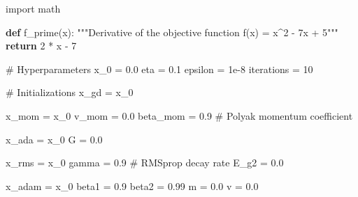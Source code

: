 \documentclass[
  letterpaper,
  DIV=11,
  numbers=noendperiod]{scrreprt}
\newenvironment{Shaded}{\begin{snugshade}}{\end{snugshade}}
\newcommand{\CommentTok}[1]{\textcolor[rgb]{0.37,0.37,0.37}{#1}}
\newcommand{\ControlFlowTok}[1]{\textcolor[rgb]{0.00,0.23,0.31}{\textbf{#1}}}
\newcommand{\DecValTok}[1]{\textcolor[rgb]{0.68,0.00,0.00}{#1}}
\newcommand{\FloatTok}[1]{\textcolor[rgb]{0.68,0.00,0.00}{#1}}
\newcommand{\ImportTok}[1]{\textcolor[rgb]{0.00,0.46,0.62}{#1}}
\newcommand{\KeywordTok}[1]{\textcolor[rgb]{0.00,0.23,0.31}{\textbf{#1}}}
\newcommand{\NormalTok}[1]{\textcolor[rgb]{0.00,0.23,0.31}{#1}}
\newcommand{\OperatorTok}[1]{\textcolor[rgb]{0.37,0.37,0.37}{#1}}
\begin{document}
\begin{Shaded}
\begin{Highlighting}[]
\ImportTok{import}\NormalTok{ math}

\KeywordTok{def}\NormalTok{ f\_prime(x):}
    \CommentTok{"""Derivative of the objective function f(x) = x\^{}2 {-} 7x + 5"""}
    \ControlFlowTok{return} \DecValTok{2} \OperatorTok{*}\NormalTok{ x }\OperatorTok{{-}} \DecValTok{7}

\CommentTok{\# Hyperparameters}
\NormalTok{x\_0 }\OperatorTok{=} \FloatTok{0.0}
\NormalTok{eta }\OperatorTok{=} \FloatTok{0.1}
\NormalTok{epsilon }\OperatorTok{=} \FloatTok{1e{-}8}
\NormalTok{iterations }\OperatorTok{=} \DecValTok{10}

\CommentTok{\# Initializations}
\NormalTok{x\_gd }\OperatorTok{=}\NormalTok{ x\_0}

\NormalTok{x\_mom }\OperatorTok{=}\NormalTok{ x\_0}
\NormalTok{v\_mom }\OperatorTok{=} \FloatTok{0.0}
\NormalTok{beta\_mom }\OperatorTok{=} \FloatTok{0.9}  \CommentTok{\# Polyak momentum coefficient}

\NormalTok{x\_ada }\OperatorTok{=}\NormalTok{ x\_0}
\NormalTok{G }\OperatorTok{=} \FloatTok{0.0}

\NormalTok{x\_rms }\OperatorTok{=}\NormalTok{ x\_0}
\NormalTok{gamma }\OperatorTok{=} \FloatTok{0.9}     \CommentTok{\# RMSprop decay rate}
\NormalTok{E\_g2 }\OperatorTok{=} \FloatTok{0.0}

\NormalTok{x\_adam }\OperatorTok{=}\NormalTok{ x\_0}
\NormalTok{beta1 }\OperatorTok{=} \FloatTok{0.9}
\NormalTok{beta2 }\OperatorTok{=} \FloatTok{0.99}
\NormalTok{m }\OperatorTok{=} \FloatTok{0.0}
\NormalTok{v }\OperatorTok{=} \FloatTok{0.0}


\end{Highlighting}
\end{Shaded}
\end{document}
